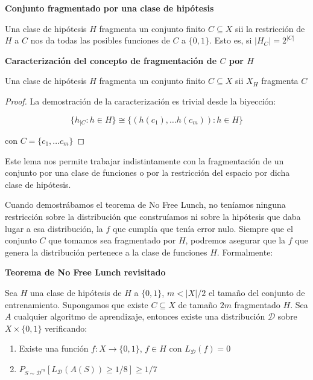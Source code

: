 \begin{definition}
\textbf{Conjunto fragmentado por una clase de hipótesis}

Una clase de hipótesis $H$ fragmenta un conjunto finito $C \subseteq X$ sii la restricción de $H$ a $C$ nos da todas las posibles funciones de $C$ a $\{0,1\}$. Esto es, si $|H_{C}| = 2^{|C|}$

\begin{lemma}
\textbf{Caracterización del concepto de fragmentación de $C$ por $H$}

Una clase de hipótesis $H$ fragmenta un conjunto finito $C \subseteq X$ sii $X_{H}$ fragmenta $C$
\end{lemma}

\begin{proof}
La demostración de la caracterización es trivial desde la biyección:

\[\{h_{|C} : h\in H\} \cong \{(h(c_1), \ldots h(c_m)): h\in H\}\]

con $C = \{c_1, \ldots c_m\}$
\end{proof}

Este lema nos permite trabajar indistintamente con la fragmentación de un conjunto por una clase de funciones o por la restricción del espacio por dicha clase de hipótesis.

Cuando demostrábamos el teorema de No Free Lunch, no teníamos ninguna restricción sobre la distribución que construíamos ni sobre la hipótesis que daba lugar a esa distribución, la $f$ que cumplía que tenía error nulo. Siempre que el conjunto $C$ que tomamos sea fragmentado por $H$, podremos asegurar que la $f$ que genera la distribución pertenece a la clase de funciones $H$. Formalmente:

\begin{theorem}
\textbf{Teorema de No Free Lunch revisitado}

Sea $H$ una clase de hipótesis de $H$ a $\{0,1\}$, $m < |X|/2$ el tamaño del conjunto de entrenamiento. Supongamos que existe $C\subseteq X$ de tamaño $2m$ fragmentado $H$. Sea $A$ cualquier algoritmo de aprendizaje, entonces existe una distribución $\mathcal{D}$ sobre $X \times \{0,1\}$ verificando:

\begin{enumerate}
\item Existe una función $f: X \rightarrow \{0,1\}$, $f\in H$ con $L_{\mathcal{D}}(f)=0$
\item $P_{S\sim \mathcal{D}^m} [L_{\mathcal{D}} (A(S)) \ge 1/8] \ge 1/7$
\end{enumerate}


\end{theorem}
\end{definition}
